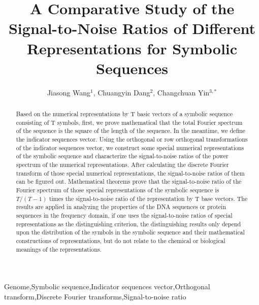 \documentclass[preprint,authoryear,12pt]{elsarticle}
\begin{document}
\begin{frontmatter}

\title{A Comparative Study of the Signal-to-Noise Ratios of Different Representations for Symbolic Sequences}
\author{Jiasong Wang$^{1}$, Chuangyin Dang$^{2}$, Changchuan Yin$^{3,\ast}$}
\address{1.Department of Mathematics, Nanjing University, Nanjing 210093, China\\
2.Department of System Engineering and Engineering Management, City University of Hong Kong, Hong Kong\\
3.College of Natural Sciences, University of Phoenix, Chicago, IL 60173, USA\\
$\ast$ Corresponding author, Email: cyinbox@email.phoenix.edu
}
\begin{abstract}
Based on the numerical representations by T basic vectors of a symbolic sequence consisting of T symbols, first, we prove mathematical that the total Fourier spectrum of the sequence is the square of the length of the sequence. In the meantime, we define the indicator sequences vector. Using the orthogonal or row orthogonal transformations of the indicator sequences vector, we construct some special numerical representations of the symbolic sequence and characterize the signal-to-noise ratios of the power spectrum of the numerical representations. After calculating the discrete Fourier transform of those special numerical representations, the signal-to-noise ratios of them can be figured out. Mathematical theorems prove that the signal-to-noise ratio of the Fourier spectrum of those special representations of the symbolic sequence is $T/(T-1)$ times the signal-to-noise ratio of the representation by T base vectors. The results are applied in analyzing the properties of the DNA sequences or protein sequences in the frequency domain, if one uses the signal-to-noise ratios of special representations as the distinguishing criterion, the distinguishing results only depend upon the distribution of the symbols in the symbolic sequence and their mathematical constructions of representations, but do not relate to the chemical or biological meanings of the representations.
\end{abstract}
\begin{keyword}
Genome\sep Symbolic sequence\sep Indicator sequences vector\sep Orthogonal transform\sep Discrete Fourier transforms\sep Signal-to-noise ratio

\end{keyword}
\end{frontmatter}
\end{document}
